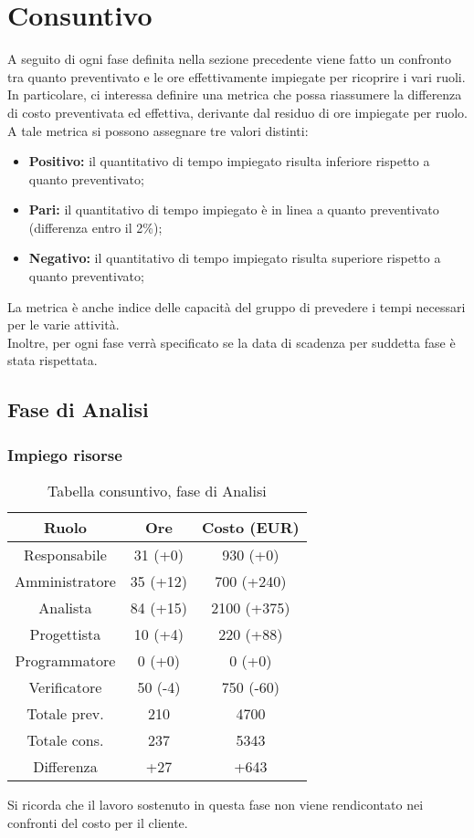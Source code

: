 \section{Consuntivo}

A seguito di ogni fase definita nella sezione precedente viene fatto un confronto tra quanto preventivato e le ore effettivamente impiegate per ricoprire i vari ruoli. In particolare, ci interessa definire una metrica che possa riassumere la differenza di costo preventivata ed effettiva, derivante dal residuo di ore impiegate per ruolo. \\ A tale metrica si possono assegnare tre valori distinti:
\begin{itemize}
	\item \textbf{Positivo:} il quantitativo di tempo impiegato risulta inferiore rispetto a quanto preventivato;
	\item \textbf{Pari:} il quantitativo di tempo impiegato è in linea a quanto preventivato (differenza entro il 2\%);
	\item \textbf{Negativo:} il quantitativo di tempo impiegato risulta superiore rispetto a quanto preventivato;
\end{itemize}
La metrica è anche indice delle capacità del gruppo di prevedere i tempi necessari per le varie attività.
\\Inoltre, per ogni fase verrà specificato se la data di scadenza per suddetta fase è stata rispettata.
\subsection{Fase di Analisi}
\subsubsection{Impiego risorse}
\begin{table}[h]
\caption{Tabella consuntivo, fase di Analisi}  
\begin{center}
\begin{tabular}{ |c|c|c|  }
 \hline
 Ruolo 		& Ore & Costo (EUR)\\
 \hline\hline
	Responsabile	& 31 (+0) & 930 (+0)\\
	Amministratore	& 35 (+12) & 700 (+240)\\
	Analista		& 84 (+15) & 2100 (+375)\\
	Progettista		& 10 (+4) & 220 (+88)\\
	Programmatore	& 0 (+0) & 0 (+0)\\
	Verificatore	& 50 (-4) & 750 (-60)\\
	\hline\hline
	Totale prev.	& 210 & 4700 \\
	Totale cons.	& 237 & 5343 \\
	Differenza		& +27 & +643 \\
 \hline
\end{tabular}
\end{center}
\end{table}
Si ricorda che il lavoro sostenuto in questa fase non viene rendicontato nei confronti del costo per il cliente.
